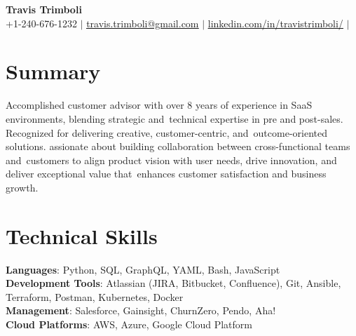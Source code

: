 \documentclass[letterpaper,11pt]{article}
\begin{document}

\begin{center}
  \textbf{\Huge \bfseries Travis Trimboli} \\ \vspace{1pt}
  \small +1-240-676-1232 $|$ \href{mailto:travis.trimboli@gmail.com}{\underline{travis.trimboli@gmail.com}} $|$
  \href{https://www.linkedin.com/in/travistrimboli/}{\underline{linkedin.com/in/travistrimboli/}} $|$
\end{center}

\section*{Summary}
Accomplished customer advisor with over 8 years of experience in SaaS environments, blending strategic and\
technical expertise in pre and post-sales. Recognized for delivering creative, customer-centric, and\
outcome-oriented solutions. assionate about building collaboration between cross-functional teams and\
customers to align product vision with user needs, drive innovation, and deliver exceptional value that\
enhances customer satisfaction and business growth.

\section{Technical Skills}
\begin{itemize}[leftmargin=0.15in, label={}]
  \small{\item{
        \textbf{Languages}{: Python, SQL, GraphQL, YAML, Bash, JavaScript} \\
        \textbf{Development Tools}{: Atlassian (JIRA, Bitbucket, Confluence), Git, Ansible, Terraform, Postman, Kubernetes, Docker} \\
        \textbf{Management}{: Salesforce, Gainsight, ChurnZero, Pendo, Aha!} \\
        \textbf{Cloud Platforms}{: AWS, Azure, Google Cloud Platform}
        }}
\end{itemize}
\end{document}
